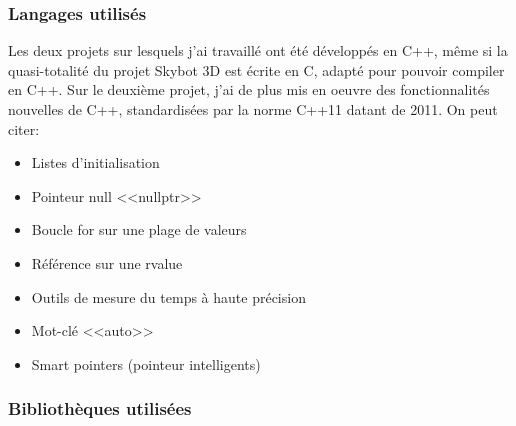 \documentclass[a4paper,french,12pt]{article}
\begin{document}
		\subsubsection{Langages utilisés}
		    Les deux projets sur lesquels j'ai travaillé ont été développés en C++, même si la quasi-totalité
		    du projet Skybot 3D est écrite en C, adapté pour pouvoir compiler en C++.
		    Sur le deuxième projet, j'ai de plus mis en oeuvre des fonctionnalités nouvelles de C++, standardisées
		    par la norme C++11 datant de 2011. On peut citer:\\

		    \begin{itemize}
		    \item Listes d'initialisation
		    \item Pointeur null <<nullptr>>
		    \item Boucle for sur une plage de valeurs
		    \item Référence sur une rvalue
		    \item Outils de mesure du temps à haute précision
		    \item Mot-clé <<auto>>
		    \item Smart pointers (pointeur intelligents)
		    \end{itemize}

		\subsubsection{Bibliothèques utilisées}
\end{document}
